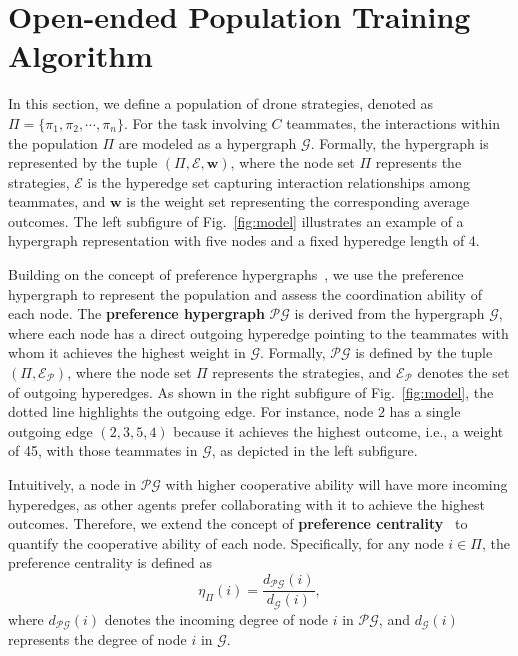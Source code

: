 \section{Open-ended Population Training Algorithm}
\label{appendix:opt}

In this section, we define a population of drone strategies, denoted as $\Pi = \{\pi_1, \pi_2, \cdots, \pi_n\}$. For the task involving $C$ teammates, the interactions within the population $\Pi$ are modeled as a hypergraph $\mathcal{G}$. Formally, the hypergraph is represented by the tuple $(\Pi, \mathcal{E}, \mathbf{w})$, where the node set $\Pi$ represents the strategies, $\mathcal{E}$ is the hyperedge set capturing interaction relationships among teammates, and $\mathbf{w}$ is the weight set representing the corresponding average outcomes. 
The left subfigure of Fig.~\ref{fig:model} illustrates an example of a hypergraph representation with five nodes and a fixed hyperedge length of 4.

Building on the concept of preference hypergraphs~\cite{hola-drone}, we use the preference hypergraph to represent the population and assess the coordination ability of each node. The \textbf{preference hypergraph} $\mathcal{P}\mathcal{G}$ is derived from the hypergraph $\mathcal{G}$, where each node has a direct outgoing hyperedge pointing to the teammates with whom it achieves the highest weight in $\mathcal{G}$. 
Formally, $\mathcal{P}\mathcal{G}$ is defined by the tuple $(\Pi, \mathcal{E}_\mathcal{P})$, where the node set $\Pi$ represents the strategies, and $\mathcal{E}_\mathcal{P}$ denotes the set of outgoing hyperedges. As shown in the right subfigure of Fig.~\ref{fig:model}, the dotted line highlights the outgoing edge. 
For instance, node $2$ has a single outgoing edge $(2, 3, 5, 4)$ because it achieves the highest outcome, i.e., a weight of 45, with those teammates in $\mathcal{G}$, as depicted in the left subfigure.

Intuitively, a node in $\mathcal{P}\mathcal{G}$ with higher cooperative ability will have more incoming hyperedges, as other agents prefer collaborating with it to achieve the highest outcomes. Therefore, we extend the concept of \textbf{preference centrality}~\cite{li2023cooperative} to quantify the cooperative ability of each node. Specifically, for any node $i \in \Pi$, the preference centrality is defined as 
\begin{equation}
    \eta_\Pi(i) = \frac{d_{\mathcal{P}\mathcal{G}}(i)}{d_{\mathcal{G}}(i)},
\end{equation}
where $d_{\mathcal{P}\mathcal{G}}(i)$ denotes the incoming degree of node $i$ in $\mathcal{P}\mathcal{G}$, and $d_{\mathcal{G}}(i)$ represents the degree of node $i$ in $\mathcal{G}$.

